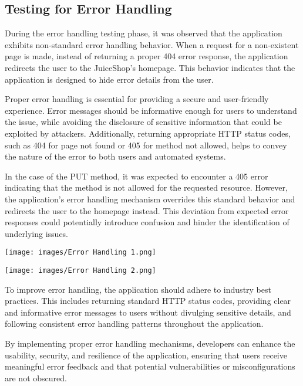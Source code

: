 \documentclass[12pt]{article}
\begin{document}
\subsection{Testing for Error Handling}
During the error handling testing phase, it was observed that the application exhibits non-standard error handling behavior. When a request for a non-existent page is made, instead of returning a proper 404 error response, the application redirects the user to the JuiceShop's homepage. This behavior indicates that the application is designed to hide error details from the user.

Proper error handling is essential for providing a secure and user-friendly experience. Error messages should be informative enough for users to understand the issue, while avoiding the disclosure of sensitive information that could be exploited by attackers. Additionally, returning appropriate HTTP status codes, such as 404 for page not found or 405 for method not allowed, helps to convey the nature of the error to both users and automated systems.

In the case of the PUT method, it was expected to encounter a 405 error indicating that the method is not allowed for the requested resource. However, the application's error handling mechanism overrides this standard behavior and redirects the user to the homepage instead. This deviation from expected error responses could potentially introduce confusion and hinder the identification of underlying issues.

\begin{center}
    \texttt{[image: images/Error Handling 1.png]}
\end{center}

\begin{center}
    \texttt{[image: images/Error Handling 2.png]}
\end{center}



To improve error handling, the application should adhere to industry best practices. This includes returning standard HTTP status codes, providing clear and informative error messages to users without divulging sensitive details, and following consistent error handling patterns throughout the application.

By implementing proper error handling mechanisms, developers can enhance the usability, security, and resilience of the application, ensuring that users receive meaningful error feedback and that potential vulnerabilities or misconfigurations are not obscured.
\end{document}
